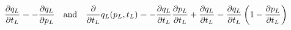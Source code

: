 \documentclass[12pt]{article}
\begin{document}
\begin{align*}
\part{q_L}{t_L} &= -\part{q_L}{p_L} \quad \text{and} \quad
\part{}{t_L}q_L(p_L, t_L) = - \part{q_L}{t_L}\part{p_L}{t_L} 
    + \part{q_L}{t_L} = \part{q_L}{t_L}\left(1-\part{p_L}{t_L} \right)
\end{align*}


 
\end{document}
